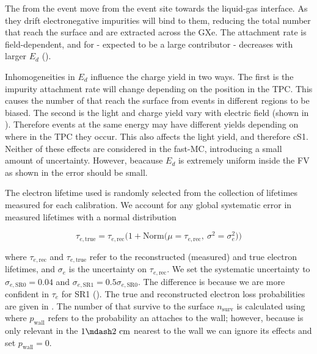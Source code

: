 The \electron from the event move from the event site towards the liquid-gas interface.  As they drift electronegative
impurities will bind to them, reducing the total number that reach the surface and are extracted across the GXe.  The attachment rate
is field-dependent, and for  - expected to be a large contributor - decreases with larger $E_d$
().

Inhomogeneities in $E_d$ influence the charge yield in two ways.  The first is the impurity attachment rate will change depending on the
position in the TPC.   This causes the number of \electron that reach the surface from events in different regions to be
biased.  The second is the light and charge yield vary with electric field (shown in
).  Therefore events at the same energy may have
different yields depending on where in the TPC they occur.  This also affects the light yield, and therefore cS1.  Neither of these
effects are considered
in the fast-MC, introducing a small amount of uncertainty.  However, beacause $E_d$ is extremely uniform inside the FV as shown in
 the error should be small.

The electron lifetime used is randomly selected from the collection of lifetimes measured for each calibration.  We account for any global
systematic error in measured lifetimes  with a normal distribution

\begin{equation}
\tau_{e, \mathrm{true}} = \tau_{e, \mathrm{rec}} \Big( 1 + \mathrm{Norm} \big( \mu = \tau_{e, \mathrm{rec}},\ \sigma^2 = \sigma_{e}^2
\big) \Big)
\label{eq:er_nr_calibrations_parameter_determ_det_phys_elife_true}
\end{equation}

\noindent where $\tau_{e, \mathrm{rec}}$ and $\tau_{e, \mathrm{true}}$ refer to the reconstructed (measured) and true electron
lifetimes, and $\sigma_e$ is the uncertainty on $\tau_{e, \mathrm{rec}}$.  We set the systematic uncertainty to 
$\sigma_{e, \mathrm{SR0}} = 0.04$ and $\sigma_{e, \mathrm{SR1}} = 0.5 \sigma_{e, \mathrm{SR0}}$.  The difference is because we are
more confident in $\tau_{e}$ for SR1 ().  The true and reconstructed electron loss probabilities
are given in
. The number of \electron that survive to the surface
$n_{\mathrm{surv}}$ is calculated using  where $p_{\mathrm{wall}}$
refers to
the probability an \electron attaches to the wall; however, because is only relevant in the $1 \mdash 2\ \mathrm{cm}$ nearest to the wall
we can ignore its effects and set $p_{\mathrm{wall}} = 0$.

